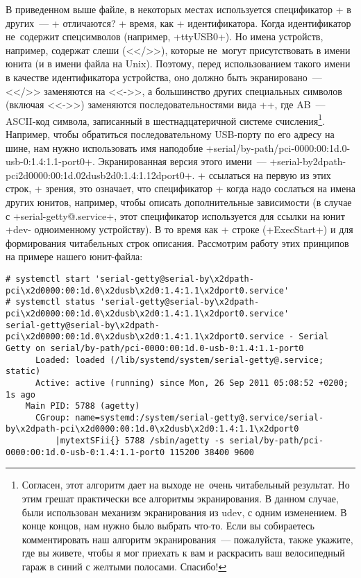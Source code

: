 \documentclass[10pt,oneside,a4paper]{article}
\begin{document}
В приведенном выше файле, в некоторых местах используется спецификатор +%
в других~--- +%
отличаются? +%
время, как +%
идентификатора. Когда идентификатор не~содержит спецсимволов (например,
+ttyUSB0+). Но имена устройств, например, содержат слеши (<</>>), которые
не~могут присутствовать в имени юнита (и в имени файла на Unix). Поэтому, перед
использованием такого имени в качестве идентификатора устройства, оно должно
быть экранировано~--- <</>> заменяются на <<->>, а большинство других
специальных символов (включая <<->>) заменяются последовательностями вида
+\xAB+, где AB~--- ASCII-код символа, записанный в шестнадцатеричной системе
счисления\footnote{Согласен, этот алгоритм дает на выходе не~очень читабельный
результат. Но этим грешат практически все алгоритмы экранирования. В данном
случае, были использован механизм экранирования из udev, с одним изменением. В
конце концов, нам нужно было выбрать что-то. Если вы собираетесь комментировать
наш алгоритм экранирования~--- пожалуйста, также укажите, где вы живете, чтобы я
мог приехать к вам и раскрасить ваш велосипедный гараж в синий с желтыми
полосами. Спасибо!}. Например, чтобы обратиться
последовательному USB-порту по его адресу на шине, нам нужно использовать имя
наподобие +serial/by-path/pci-0000:00:1d.0-usb-0:1.4:1.1-port0+. Экранированная
версия этого имени~---
+serial-by\x2dpath-pci\x2d0000:00:1d.0\x2dusb\x2d0:1.4:1.1\x2dport0+. +%
ссылаться на первую из этих строк, +%
зрения, это означает, что спецификатор +%
когда надо сослаться на имена других юнитов, например, чтобы описать
дополнительные зависимости (в случае с +serial-getty@.service+, этот
спецификатор используется для ссылки на юнит +dev-%
одноименному устройству). В то время как +%
строке (+ExecStart+) и для формирования читабельных строк описания. Рассмотрим
работу этих принципов на примере нашего юнит-файла:
\begin{landscape}
\begin{Verbatim}[fontsize=\small,commandchars=|\{\}]
# systemctl start 'serial-getty@serial-by\x2dpath-pci\x2d0000:00:1d.0\x2dusb\x2d0:1.4:1.1\x2dport0.service'
# systemctl status 'serial-getty@serial-by\x2dpath-pci\x2d0000:00:1d.0\x2dusb\x2d0:1.4:1.1\x2dport0.service'
serial-getty@serial-by\x2dpath-pci\x2d0000:00:1d.0\x2dusb\x2d0:1.4:1.1\x2dport0.service - Serial Getty on serial/by-path/pci-0000:00:1d.0-usb-0:1.4:1.1-port0
	  Loaded: loaded (/lib/systemd/system/serial-getty@.service; static)
	  Active: active (running) since Mon, 26 Sep 2011 05:08:52 +0200; 1s ago
	Main PID: 5788 (agetty)
	  CGroup: name=systemd:/system/serial-getty@.service/serial-by\x2dpath-pci\x2d0000:00:1d.0\x2dusb\x2d0:1.4:1.1\x2dport0
		  |mytextSFii{} 5788 /sbin/agetty -s serial/by-path/pci-0000:00:1d.0-usb-0:1.4:1.1-port0 115200 38400 9600
\end{Verbatim}
\end{landscape}
\end{document}
